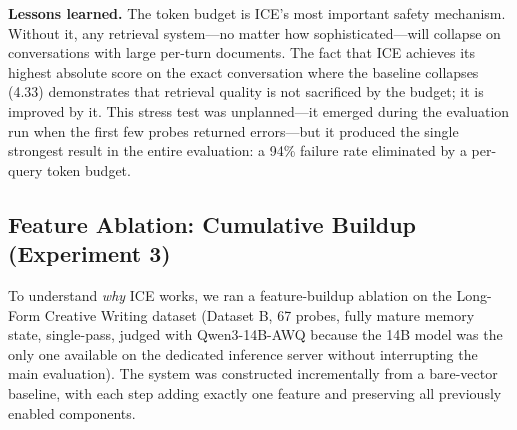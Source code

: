 \documentclass[10pt]{article}
\begin{document}
\textbf{Lessons learned.} The token budget is ICE's most important safety mechanism. Without it, any retrieval system---no matter how sophisticated---will collapse on conversations with large per-turn documents. The fact that ICE achieves its highest absolute score on the exact conversation where the baseline collapses (4.33) demonstrates that retrieval quality is not sacrificed by the budget; it is improved by it. This stress test was unplanned---it emerged during the evaluation run when the first few probes returned errors---but it produced the single strongest result in the entire evaluation: a 94\% failure rate eliminated by a per-query token budget.

\subsection{Feature Ablation: Cumulative Buildup (Experiment 3)}
\label{sec:ablation}

To understand \emph{why} ICE works, we ran a feature-buildup ablation on the Long-Form Creative Writing dataset (Dataset B, 67 probes, fully mature memory state, single-pass, judged with Qwen3-14B-AWQ because the 14B model was the only one available on the dedicated inference server without interrupting the main evaluation). The system was constructed incrementally from a bare-vector baseline, with each step adding exactly one feature and preserving all previously enabled components.
\end{document}
